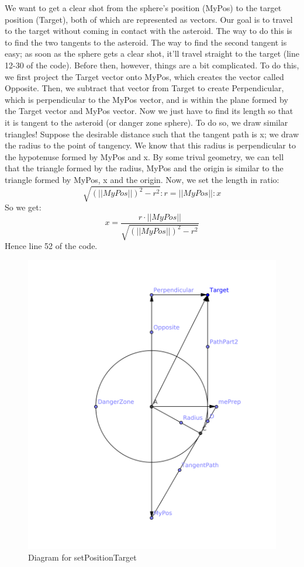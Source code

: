 \documentclass [12 pt, twoside] {article}
\begin{document}
We want to get a clear shot from the sphere’s position (MyPos) to the target position
(Target), both of which are represented as vectors. Our goal is to travel to the target without coming in contact with the asteroid. The way to do this is to find the two tangents to the asteroid.
The way to find the second tangent is easy; as soon as the sphere gets a clear shot, it’ll travel
straight to the target (line 12-30 of the code). Before then, however, things are a bit complicated.
To do this, we first project the Target vector onto MyPos, which creates the vector called
Opposite. Then, we subtract that vector from Target to create Perpendicular, which is perpendicular
to the MyPos vector, and is within the plane formed by the Target vector and MyPos vector. Now we 
just have to find its length so that it is tangent to the asteroid (or danger zone sphere). To do so, we draw similar triangles! Suppose
the desirable distance such that the tangent path is x; we draw the radius to the point of
tangency. We know that this radius is perpendicular to the hypotenuse formed by MyPos and x.
By some trival geometry, we can tell that the triangle formed by the radius, MyPos and the origin
is similar to the triangle formed by MyPos, x and the origin. Now, we set the length in ratio:
$$\sqrt{(||MyPos||)^2 - r^2} : r = ||MyPos|| : x$$
So we get:
$$x = \frac{r \cdot ||MyPos||}{\sqrt{(||MyPos||)^2 - r^2}}$$
Hence line 52 of the code.

\begin{figure}[h]
\centering
\includegraphics[scale=0.2]{setPositionTarget.png}
\caption{Diagram for setPositionTarget}
\end{figure}
\end{document}

